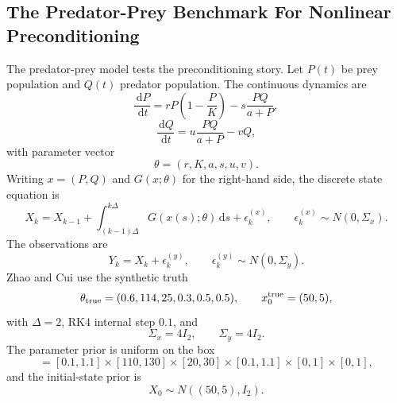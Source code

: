 \documentclass[11pt]{article}
\numberwithin{equation}{section}
\newcommand{\dd}{\,\mathrm d}
\begin{document}
\subsection{The Predator-Prey Benchmark For Nonlinear Preconditioning}

The predator-prey model tests the preconditioning story.  Let \(P(t)\) be prey
population and \(Q(t)\) predator population.  The continuous dynamics are
\begin{equation}
    \frac{\dd P}{\dd t}
    =
    rP\left(1-\frac{P}{K}\right)
    -
    s\frac{PQ}{a+P},
    \label{eq:p27-pp1}
\end{equation}
\begin{equation}
    \frac{\dd Q}{\dd t}
    =
    u\frac{PQ}{a+P}-vQ,
    \label{eq:p27-pp2}
\end{equation}
with parameter vector
\begin{equation}
    \theta=(r,K,a,s,u,v).
    \label{eq:p27-pp3}
\end{equation}
Writing \(x=(P,Q)\) and \(G(x;\theta)\) for the right-hand side, the discrete
state equation is
\begin{equation}
    X_k
    =
    X_{k-1}
    +
    \int_{(k-1)\Delta}^{k\Delta}
    G(x(s);\theta)\dd s
    +
    \epsilon_k^{(x)},
    \qquad
    \epsilon_k^{(x)}\sim N(0,\Sigma_x).
    \label{eq:p27-pp4}
\end{equation}
The observations are
\begin{equation}
    Y_k=X_k+\epsilon_k^{(y)},
    \qquad
    \epsilon_k^{(y)}\sim N(0,\Sigma_y).
    \label{eq:p27-pp5}
\end{equation}
Zhao and Cui use the synthetic truth
\begin{equation}
    \theta_{\rm true}
    =
    (0.6,114,25,0.3,0.5,0.5),
    \qquad
    x_0^{\rm true}=(50,5),
    \label{eq:p27-pp5a}
\end{equation}
with \(\Delta=2\), RK4 internal step \(0.1\), and
\begin{equation}
    \Sigma_x=4I_2,
    \qquad
    \Sigma_y=4I_2.
    \label{eq:p27-pp5b}
\end{equation}
The parameter prior is uniform on the box
\begin{equation}
    [a,b]
    =
    [0.1,1.1]\times[110,130]\times[20,30]
    \times[0.1,1.1]\times[0,1]\times[0,1],
    \label{eq:p27-pp5c}
\end{equation}
and the initial-state prior is
\begin{equation}
    X_0\sim N((50,5),I_2).
    \label{eq:p27-pp5d}
\end{equation}
\end{document}

